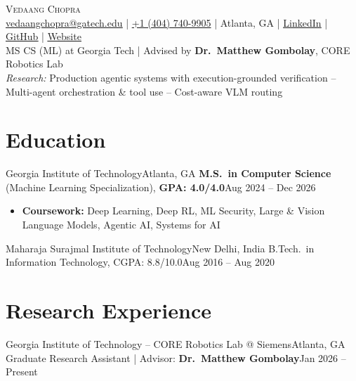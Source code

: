 \documentclass[letterpaper,11pt]{article}
\begin{document}
\begin{center}
  {\Huge \scshape Vedaang Chopra} \\ \vspace{2pt}
  \small
  \href{mailto:vedaangchopra@gatech.edu}{\underline{vedaangchopra@gatech.edu}} \;|\;
  \underline{+1 (404) 740-9905} \;|\;
  Atlanta, GA \;|\;
  \href{https://linkedin.com/in/vedaang-chopra}{\underline{LinkedIn}} \;|\;
  \href{https://github.com/Vedaang-Chopra}{\underline{GitHub}} \;|\;
  \href{https://vedaangchopra.live/}{\underline{Website}}
  \\ \vspace{3pt}
  \small
  MS CS (ML) at Georgia Tech \;|\; Advised by \textbf{Dr.\ Matthew Gombolay}, CORE Robotics Lab \\
  \textit{Research:} Production agentic systems with execution-grounded verification -- Multi-agent orchestration \& tool use -- Cost-aware VLM routing
\end{center}
\vspace{-6pt}

\section{Education}
\resumeSubHeadingListStart
\resumeSubheading
{Georgia Institute of Technology}{Atlanta, GA}
{\textbf{M.S.\ in Computer Science} (Machine Learning Specialization), \textbf{GPA: 4.0/4.0}}{Aug 2024 -- Dec 2026}
\vspace{-3pt}
\begin{itemize}[leftmargin=0.20in, topsep=0pt, itemsep=0pt]
  \item\footnotesize{\textbf{Coursework:} Deep Learning, Deep RL, ML Security, Large \& Vision Language Models, Agentic AI, Systems for AI}
\end{itemize}
\vspace{-6pt}
\resumeEducationCompact
{Maharaja Surajmal Institute of Technology}{New Delhi, India}
{B.Tech.\ in Information Technology, CGPA: 8.8/10.0}{Aug 2016 -- Aug 2020}
\resumeSubHeadingListEnd

\section{Research Experience}
\resumeSubHeadingListStart
\resumeSubheading
{Georgia Institute of Technology -- CORE Robotics Lab @ Siemens}{Atlanta, GA}
{Graduate Research Assistant \;|\; Advisor: \textbf{Dr.\ Matthew Gombolay}}{Jan 2026 -- Present}
\resumeItemListStart
\end{document}
